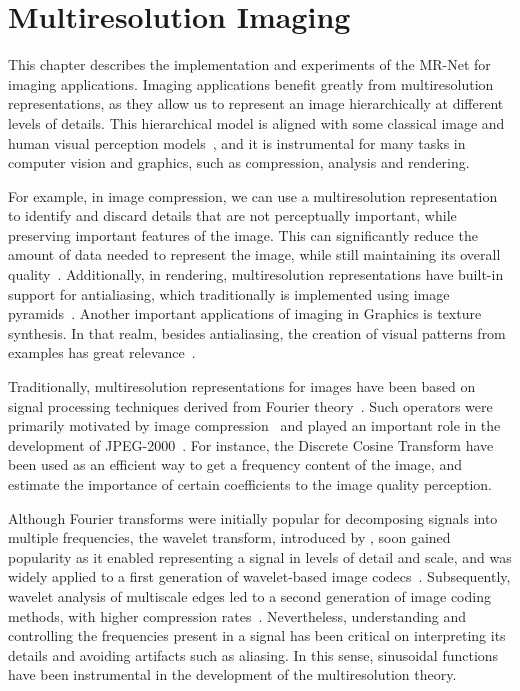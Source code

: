 \chapter{Multiresolution Imaging}
\label{ch:imaging}

This chapter describes the implementation and experiments of the MR-Net for imaging applications. Imaging applications benefit greatly from multiresolution representations, as they allow us to represent an image hierarchically at different levels of details. This hierarchical model is aligned with some classical image and human visual perception models~\cite{marr82}, and it is instrumental for many tasks in computer vision and graphics, such as compression, analysis and rendering. 

For example, in image compression, we can use a multiresolution representation to identify and discard details that are not perceptually important, while preserving important features of the image. This can significantly reduce the amount of data needed to represent the image, while still maintaining its overall quality~\cite{burt1987laplacian}. Additionally, in rendering, multiresolution representations have built-in support for antialiasing, which traditionally is implemented using image pyramids~\cite{mipmap83}. Another important applications of imaging in Graphics is texture synthesis. In that realm, besides antialiasing, the creation of visual patterns from examples has great relevance~\cite{thies19}.

Traditionally, multiresolution representations for images have been based on signal processing techniques derived from Fourier theory~\cite{bracewell1986fourier}. Such operators were primarily motivated by image compression~\cite{bhaskaran1997image} and played an important role in the development of JPEG-2000~\cite{marcellin2000overview}. For instance, the Discrete Cosine Transform \cite{dct-og} have been  used as an efficient way to get a frequency content of the image, and estimate the importance of certain coefficients to the image quality perception. 

Although Fourier transforms were initially popular for decomposing signals into multiple frequencies, the wavelet transform, introduced by \citet{mallat1989theory}, soon gained popularity as it enabled representing a signal in levels of detail and scale, and was widely applied to a first generation of wavelet-based image codecs~\cite{antonini1992image}. Subsequently, wavelet analysis of multiscale edges led to a second generation of image coding methods, with higher compression rates~\cite{mallat-2gen}. Nevertheless, understanding and controlling the frequencies present in a signal has been critical on interpreting its details and avoiding artifacts such as aliasing. In this sense, sinusoidal  functions have been instrumental in the development of the multiresolution theory.


